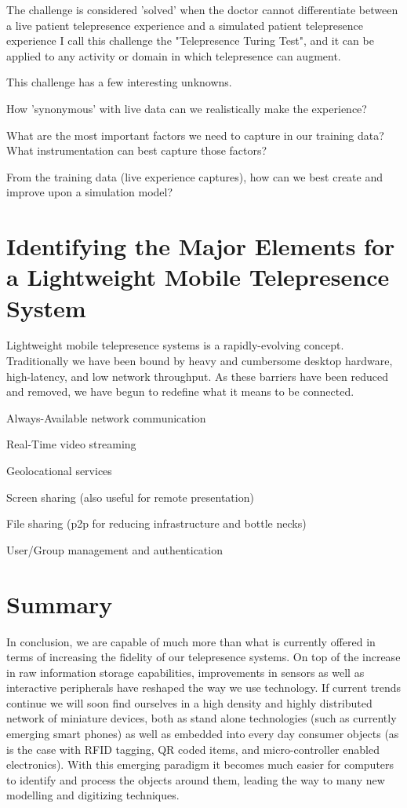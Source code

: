 \documentclass[a4paper,12pt]{report}
\begin{document}
The challenge is considered 'solved' when the doctor cannot differentiate between a live patient telepresence experience and a simulated patient telepresence experience
I call this challenge the "Telepresence Turing Test", and it can be applied to any activity or domain in which telepresence can augment.

This challenge has a few interesting unknowns.

How 'synonymous' with live data can we realistically make the experience?

What are the most important factors we need to capture in our training data? What instrumentation can best capture those factors?

From the training data (live experience captures), how can we best create and improve upon a simulation model?\cite{391769} 
\fi
\section{Identifying the Major Elements for a Lightweight Mobile Telepresence System}

Lightweight mobile telepresence systems is a rapidly-evolving concept. Traditionally we have been bound by heavy and cumbersome desktop hardware, high-latency, and low network throughput. As these barriers have been reduced and removed, we have begun to redefine what it means to be connected.

Always-Available network communication

Real-Time video streaming

Geolocational services

Screen sharing (also useful for remote presentation)

File sharing (p2p for reducing infrastructure and bottle necks)

User/Group management and authentication

\section{Summary}

In conclusion, we are capable of much more than what is currently offered in terms of increasing the fidelity of our telepresence systems. On top of the increase in raw information storage capabilities, improvements in sensors as well as interactive peripherals have reshaped the way we use technology. If current trends continue we will soon find ourselves in a high density and highly distributed network of miniature devices, both as stand alone technologies (such as currently emerging smart phones) as well as embedded into every day consumer objects (as is the case with RFID tagging, QR coded items, and micro-controller enabled electronics). With this emerging paradigm it becomes much easier for computers to identify and process the objects around them, leading the way to many new modelling and digitizing techniques.
\end{document}

